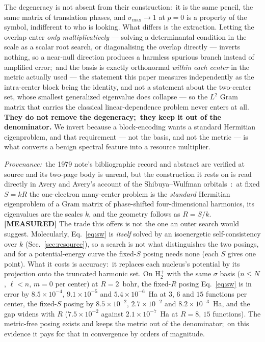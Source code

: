 \documentclass[aps,pra,twocolumn,superscriptaddress,longbibliography]{revtex4-2}
\begin{document}
The degeneracy is not absent from their construction:\ it is the same pencil,
the same matrix of translation phases, and $\sigma_{\max}\to1$ at $p=0$ is a
property of the symbol, indifferent to who is looking.  What differs is the
extraction.  Letting the overlap enter \emph{only multiplicatively} --- solving
a determinantal condition in the scale as a scalar root search, or
diagonalising the overlap directly --- inverts nothing, so a near-null
direction produces a harmless spurious branch instead of amplified error;\ and
the basis is exactly orthonormal \emph{within each center} in the metric
actually used --- the statement this paper measures independently as the
intra-center block being the identity, and not a statement about the two-center
set, whose smallest generalized eigenvalue does collapse --- so
the $L^2$ Gram matrix that carries the classical linear-dependence problem never
enters at all.  \textbf{They do not remove the degeneracy;\ they keep it out of
the denominator.}  We invert because a block-encoding wants a standard Hermitian
eigenproblem, and that requirement --- not the basis, and not the metric --- is
what converts a benign spectral feature into a resource multiplier.

\emph{Provenance:}\ the 1979 note's bibliographic record and abstract are
verified at source and its two-page body is unread, but the construction it
rests on is read directly in Avery and Avery's account of the Shibuya--Wulfman
orbitals~\cite{avery2017}:\ at fixed $S=kR$ the one-electron many-center
problem is the \emph{standard} Hermitian eigenproblem of a Gram matrix of
phase-shifted four-dimensional harmonics, its eigenvalues are the scales $k$,
and the geometry follows as $R=S/k$.  \textbf{[MEASURED]} The trade this
offers is not the one an outer search would suggest.  Molecularly,
Eq.~\eqref{eq:sw} is \emph{itself} solved by an isoenergetic self-consistency
over $k$ (Sec.~\ref{sec:resource}), so a search is not what distinguishes the
two posings, and for a potential-energy curve the fixed-$S$ posing needs none
(each $S$ gives one point).  What it costs is accuracy:\ it replaces each
nucleus's potential by its projection onto the truncated harmonic set.  On
$\mathrm{H}_2^+$ with the same $\sigma$ basis ($n\le N$, $\ell<n$, $m=0$ per
center) at $R=2$~bohr, the fixed-$R$ posing Eq.~\eqref{eq:sw} is in error by
$8.5\times10^{-4}$, $9.1\times10^{-5}$ and $5.4\times10^{-6}$~Ha at $3$, $6$
and $15$ functions per center, the fixed-$S$ posing by $8.5\times10^{-2}$,
$2.7\times10^{-2}$ and $8.2\times10^{-3}$~Ha, and the gap widens with $R$
($7.5\times10^{-2}$ against $2.1\times10^{-7}$~Ha at $R=8$, $15$ functions).
The metric-free posing exists and keeps the metric out of the denominator;\ on
this evidence it pays for that in convergence by orders of magnitude.
\end{document}
